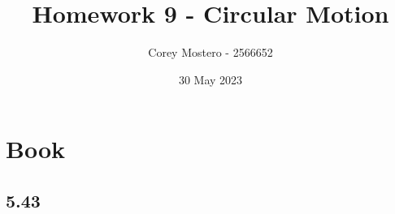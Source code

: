 \documentclass{article}
\title{Homework 9 - Circular Motion}
\author{Corey Mostero - 2566652}
\date{30 May 2023}
\begin{document}
\newcommand{\hr}{\par\noindent\rule{\textwidth}{0.4pt}}

\newcommand{\bc}[1]{
	\begin{equation*}
		\begin{boxed}
			{#1}
		\end{boxed}
	\end{equation*}
}

\newcommand{\cond}[2]{
	\ifmmode
		{#1} \quad {#2}
	\else
		$$ {#1} \quad {#2} $$
	\fi
}

\newcommand{\matr}[1]{
	\ifmmode \bm{#1}
	\else \textit{\textbf{#1}}
	\fi
}
\newcommand{\vect}[1]{
	\ifmmode \mathbf{#1}
	\else \textbf{#1}
	\fi
}


\maketitle
\newpage

\tableofcontents

\section{Book}

\subsection{5.43}
\end{document}
